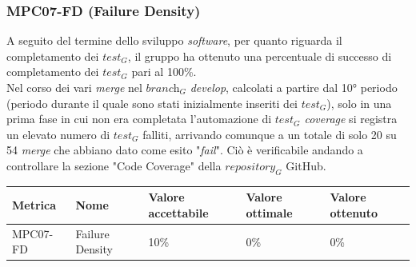 \subsubsection{MPC07-FD (Failure Density)}
A seguito del termine dello sviluppo \textit{software}, per quanto riguarda il completamento dei $\textit{test}_G$, il gruppo ha ottenuto una percentuale di successo di completamento dei $\textit{test}_G$ pari al 100\%. \\
Nel corso dei vari \textit{merge} nel $\textit{branch}_G$ \textit{develop}, calcolati a partire dal 10° periodo (periodo durante il quale sono stati inizialmente inseriti dei \textit{$\textit{test}_G$}), solo in una prima fase in cui non era completata l'automazione di \textit{$\textit{test}_G$ coverage} si registra un elevato numero di $\textit{test}_G$ falliti, arrivando comunque a un totale di solo 20 su 54 \textit{merge} che abbiano dato come esito "\textit{fail}". Ciò è verificabile andando a controllare la sezione "Code Coverage" della $\textit{repository}_G$ GitHub.
\begin{center}
    \begin{tabular}{|p{3cm}|p{4cm}|p{3cm}|p{3cm}|p{3cm}|}
    \hline
    \textbf{Metrica} & \textbf{Nome} & \textbf{Valore \newline accettabile} & \textbf{Valore \newline ottimale} & \textbf{Valore \newline ottenuto} \\
    \hline
    MPC07-FD & Failure Density & 10\% & 0\% & 0\% \\
    \hline
    \end{tabular}
\end{center}